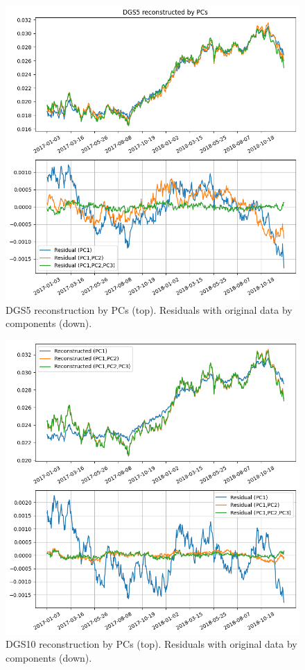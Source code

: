 \begin{enumerate}
\begin{figure}[hp]
	\centering
	\includegraphics[width=0.7\linewidth]{figures/pca_dsg5}
	\caption{DGS5 reconstruction by PCs (top). Residuals with original data by components (down).}
	\label{fig:pca_dsg5}
\end{figure}

\begin{figure}[hp]
	\centering
	\includegraphics[width=0.7\linewidth]{figures/pca_dsg10}
	\caption{DGS10 reconstruction by PCs (top). Residuals with original data by components (down).}
	\label{fig:pca_dsg10}
\end{figure}


\end{enumerate}
